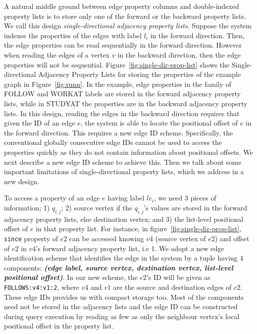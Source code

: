 A natural middle ground between edge property columns and double-indexed property lists is to store only one of the forward or the backward property lists. We call this design \emph{single-directional adjacency property lists}. Suppose the system indexes the properties of the edges with label $l_i$ in the forward direction. Then, the edge properties can be read sequentially in the forward direction. However when reading the edges of a vertex $v$ in the backward direction, then the edge properties will not be sequential. Figure~\ref{fig:single-dir-prop-list} shows the Single-directional Adjacency Property Lists for storing the properties of the example graph in Figure~\ref{fig:runn}. In the example, edge properties in the family of FOLLOW and WORKAT labels are stored in the forward adjacency property lists, while in STUDYAT the properties are in the backward adjacency property lists. In this design, reading the edges in the backward direction requires that given the ID of an edge $e$, the system is able to locate the positional offset of $e$ in the forward direction. This requires a new edge ID scheme. Specifically, the conventional globally consecutive edge IDs cannot be used to access the properties quickly as they do not contain information about positional offsets. We next describe a new edge ID scheme to achieve this. Then we talk about some important limitations of single-directional property lists, which we address in a new design.

To access a property of an edge $e$ having label $le_i$, we need 3 pieces of information; 1) $q_{i,j}$; 2) source vertex if the $q_{i,j}$'s values are stored in the forward adjacency property lists, else destination vertex; and 3) the list-level positional offset of $e$ in that property list. For instance, in figure~\ref{fig:single-dir-prop-list}, \texttt{since} property of $e2$ can be accessed knowing $v4$ (source vertex of $e2$) and offset of $e2$ in $v4$'s forward adjacency property list, i.e 1. We adopt a new edge identification scheme that identifies the edge in the system by a tuple having 4 components: \textbf{\emph{(edge label, source vertex, destination vertex, list-level positional offset)}}. In our new scheme, the $e2$'s ID will be given as \texttt{FOLLOWS:v4:v1:2}, where $v4$ and $v1$ are the source and destination edges of $e2$. These edge IDs provides us with compact storage too. Most of the components need not be stored in the adjacency lists and the edge ID can be constructed during query execution by reading as few as only the neighbour vertex's local positional offset in the property list. 

